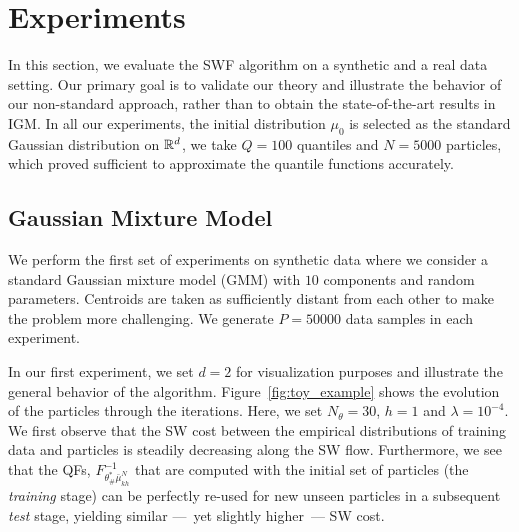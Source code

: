 %

\section{Experiments}


%
In this section, we evaluate the SWF algorithm on a synthetic and a real data setting. Our primary goal is to validate our theory and illustrate the behavior of our non-standard approach, rather than to obtain the state-of-the-art results in IGM. In all our experiments, the initial distribution $\mu_0$ is selected as the standard Gaussian distribution on $\mathbb{R}^d$, we take $Q=100$ quantiles and $N=5000$ particles, which proved sufficient to approximate the quantile functions accurately.


\subsection{Gaussian Mixture Model }
We perform the first set of experiments on synthetic data where we consider a standard Gaussian mixture model (GMM) with $10$ components and random parameters. Centroids are taken as sufficiently distant from each other to make the problem more challenging. We generate $P=50000$ data samples in each experiment.

In our first experiment, we set $d=2$ for visualization purposes and illustrate the general behavior of the algorithm. Figure~\ref{fig:toy_example} shows the evolution of the particles through the iterations. Here, we set $N_\theta=30$, $h=1$ and $\lambda=10^{-4}$.
%
We first observe that the SW cost between the empirical distributions of training data and particles is steadily decreasing along the SW flow. Furthermore, we see that the QFs, $F^{-1}_{\theta^*_\#\bar{\mu}_{kh}^{N}}$ that are computed with the initial set of particles (the \textit{training} stage) can be perfectly re-used for new unseen particles in a subsequent \textit{test} stage, yielding similar ---~yet slightly higher~--- SW cost.

